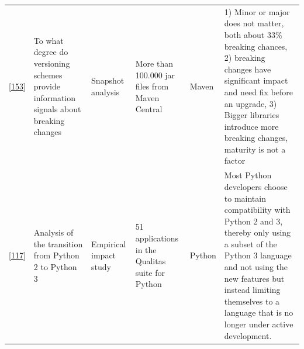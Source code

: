 \documentclass[]{book}
\begin{document}
\begin{longtable}[]{@{}llllll@{}}
\begin{minipage}[t]{0.10\columnwidth}
{[}\protect\hyperlink{ref-Raemaekers2017}{153}{]}\strut
\end{minipage} & \begin{minipage}[t]{0.18\columnwidth}\raggedright\strut
To what degree do versioning schemes provide information signals about
breaking changes\strut
\end{minipage} & \begin{minipage}[t]{0.19\columnwidth}\raggedright\strut
Snapshot analysis\strut
\end{minipage} & \begin{minipage}[t]{0.11\columnwidth}\raggedright\strut
More than 100.000 jar files from Maven Central\strut
\end{minipage} & \begin{minipage}[t]{0.13\columnwidth}\raggedright\strut
Maven\strut
\end{minipage} & \begin{minipage}[t]{0.11\columnwidth}\raggedright\strut
1) Minor or major does not matter, both about 33\% breaking chances, 2)
breaking changes have significant impact and need fix before an upgrade,
3) Bigger libraries introduce more breaking changes, maturity is not a
factor\strut
\end{minipage}\tabularnewline
\begin{minipage}[t]{0.10\columnwidth}\raggedright\strut
{[}\protect\hyperlink{ref-Malloy2018}{117}{]}\strut
\end{minipage} & \begin{minipage}[t]{0.18\columnwidth}\raggedright\strut
Analysis of the transition from Python 2 to Python 3\strut
\end{minipage} & \begin{minipage}[t]{0.19\columnwidth}\raggedright\strut
Empirical impact study\strut
\end{minipage} & \begin{minipage}[t]{0.11\columnwidth}\raggedright\strut
51 applications in the Qualitas suite for Python\strut
\end{minipage} & \begin{minipage}[t]{0.13\columnwidth}\raggedright\strut
Python\strut
\end{minipage} & \begin{minipage}[t]{0.11\columnwidth}\raggedright\strut
Most Python developers choose to maintain compatibility with Python 2
and 3, thereby only using a subset of the Python 3 language and not
using the new features but instead limiting themselves to a language
that is no longer under active development.\strut

\end{minipage}
\end{longtable}
\end{document}
